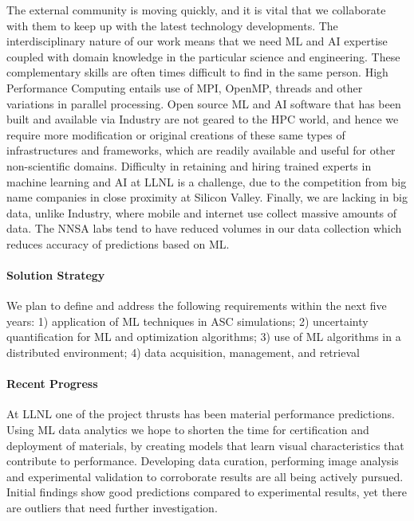 The external community is moving quickly, and it is vital that we collaborate with them to keep up with the latest 
technology developments.  The interdisciplinary nature of our work means that we need ML and AI expertise coupled 
with domain knowledge in the particular science and engineering.  These complementary skills are often times difficult 
to find in the same person.  High Performance Computing entails use of MPI, OpenMP, threads and other variations in 
parallel processing.  Open source ML and AI software that has been built and available via Industry are not geared 
to the HPC world, and hence we require more modification or original creations of these same types of infrastructures 
and frameworks, which are readily available and useful  for other non-scientific domains.  Difficulty in retaining 
and hiring trained experts in machine learning and AI at LLNL is a challenge, due to the competition from big name 
companies in close proximity at Silicon Valley.  Finally, we are lacking in big data, unlike Industry, where mobile 
and internet use collect massive amounts of data.  The NNSA labs tend to have reduced volumes in our data collection 
which reduces accuracy of predictions based on ML.

\paragraph{Solution Strategy}

We plan to define and address the following requirements within the next five years: 
1) application of ML techniques in ASC simulations; 2) uncertainty quantification for ML and optimization algorithms; 
3) use of ML algorithms in a distributed environment; 4) data acquisition, management, and retrieval

\paragraph{Recent Progress}

At LLNL one of the project thrusts has been material performance predictions.  Using ML data analytics we hope 
to shorten the time for certification and deployment of materials, by creating models that learn visual 
characteristics that contribute to performance.  Developing data curation, performing image analysis and 
experimental validation to corroborate results are all being actively pursued.  Initial findings show good 
predictions compared to experimental results, yet there are outliers that need further investigation.

